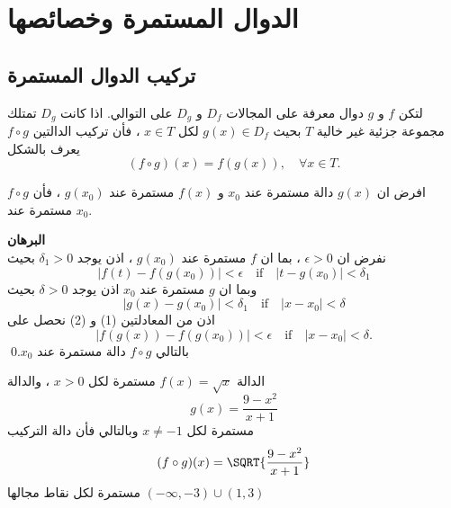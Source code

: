 \chapter{الدوال المستمرة وخصائصها}

\section{تركيب الدوال المستمرة}

\begin{definition}
	لتكن $f$ و $g$ دوال معرفة على المجالات $D_f$ و $D_g$ على التوالي. اذا كانت $D_g$ تمتلك مجموعة جزئية غير خالية $T$ بحيث $g(x) \in D_f$ لكل $x\in T$ ، فأن تركيب الدالتين $f\circ g$ يعرف بالشكل
	\[
	(f \circ g)(x) = f(g(x)), \quad \forall x\in T.
	\]
\end{definition}

\begin{theorem}
	افرض ان $g(x)$ دالة مستمرة عند $x_0 $ و $f(x)$ مستمرة عند $g(x_0)$  ، فأن $f\circ g$ مستمرة عند $x_0$.
\end{theorem}
\noindent
\textbf{البرهان}\\
\noindent
نفرض ان $\epsilon > 0 $ ، بما ان $f$ مستمرة عند $g(x_0)$ ، اذن يوجد $\delta_1> 0 $ بحيث
\begin{equation}
	| f(t)  - f(g(x_0))| < \epsilon \quad\text{if}\quad |t - g(x_0)| < \delta_1
\end{equation}
وبما ان $g$ مستمرة عند $x_0 $ اذن يوجد $\delta > 0 $ بحيث
\begin{equation}
	|g(x) - g(x_0) | < \delta_1 \quad\text{if}\quad |x-x_0| < \delta
\end{equation}
اذن من المعادلتين (1) و (2) نحصل على 
\[
|f(g(x)) - f(g(x_0)) | < \epsilon \quad\text{if}\quad |x-x_0| < \delta.
\] 
بالتالي $f\circ g$ دالة مستمرة عند $x_0$.\qed

\begin{example}
	الدالة $f(x) = \sqrt{x}$ مستمرة لكل $x> 0 $ ، والدالة
	\[
	g(x) = \frac{9 - x^2}{x + 1} 
	\]
	مستمرة لكل $x \neq -1 $ وبالتالي فأن دالة التركيب 
	\[
	(f\circ g)(x) = \SQRT{\frac{9-x^2}{x+1}}
	\]
	مستمرة لكل نقاط مجالها  
	$(-\infty, -3) \cup (1,3)$
\end{example}